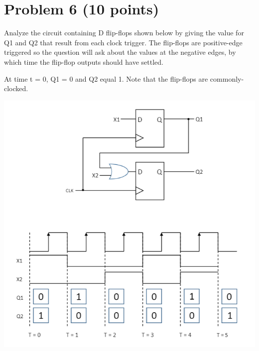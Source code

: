 \documentclass{article}
\begin{document}
\section*{Problem 6 (10 points)}
Analyze the circuit containing D flip-flops shown below by giving the value for Q1 and Q2 that  result  from  each  clock  trigger.  The  flip-flops  are  positive-edge  triggered  so  the question  will  ask  about  the  values  at  the  negative  edges,  by  which  time  the  flip-flop outputs should have settled.

At time t = 0, Q1 = 0 and Q2 equal 1. Note that the flip-flops are commonly-clocked.
\begin{center}
    \includegraphics[width = .7\textwidth]{logic.png}  
\end{center}
\newpage
\end{document}

